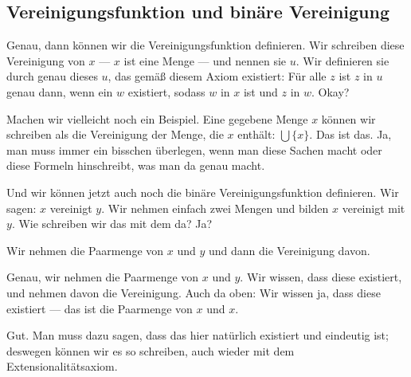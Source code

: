 \begin{math-stroke}
\begin{axioms}
\end{axioms}
\end{math-stroke}

\subsection{Vereinigungsfunktion und binäre Vereinigung}
\begin{spoken-clean}[00:15:06 - 00:17:17]
Genau, dann können wir die Vereinigungsfunktion definieren. Wir schreiben diese Vereinigung von $x$ --- $x$ ist eine Menge --- und nennen sie $u$. Wir definieren sie durch genau dieses $u$, das gemäß diesem Axiom existiert: Für alle $z$ ist $z$ in $u$ genau dann, wenn ein $w$ existiert, sodass $w$ in $x$ ist und $z$ in $w$. Okay?

Machen wir vielleicht noch ein Beispiel. Eine gegebene Menge $x$ können wir schreiben als die Vereinigung der Menge, die $x$ enthält: $\bigcup \{x\}$. Das ist das. Ja, man muss immer ein bisschen überlegen, wenn man diese Sachen macht oder diese Formeln hinschreibt, was man da genau macht.

Und wir können jetzt auch noch die binäre Vereinigungsfunktion definieren. Wir sagen: $x$ vereinigt $y$. Wir nehmen einfach zwei Mengen und bilden $x$ vereinigt mit $y$. Wie schreiben wir das mit dem da? Ja?
\end{spoken-clean}

\begin{student-interaction}[Studentenantwort]
Wir nehmen die Paarmenge von $x$ und $y$ und dann die Vereinigung davon.
\end{student-interaction}

\begin{spoken-clean}[continued]
Genau, wir nehmen die Paarmenge von $x$ und $y$. Wir wissen, dass diese existiert, und nehmen davon die Vereinigung. Auch da oben: Wir wissen ja, dass diese existiert --- das ist die Paarmenge von $x$ und $x$.

Gut. Man muss dazu sagen, dass das hier natürlich existiert und eindeutig ist; deswegen können wir es so schreiben, auch wieder mit dem Extensionalitätsaxiom.
\end{spoken-clean}

